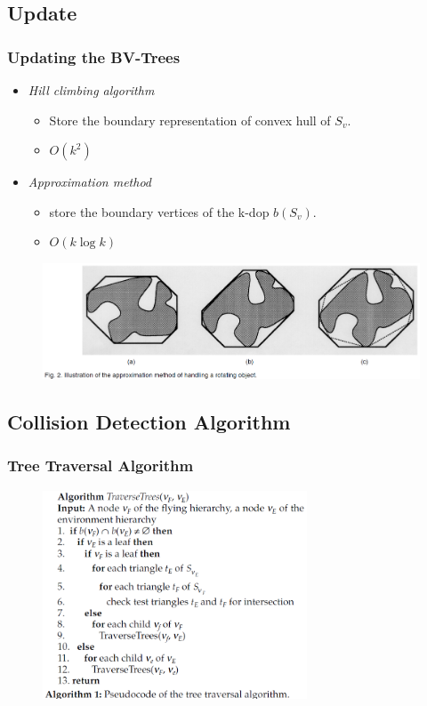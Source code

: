 \documentclass{beamer}
\begin{document}
\subsection{Update}
	\begin{frame}
	\frametitle{Updating the BV-Trees}
	\begin{itemize}
		\item \it{Hill climbing algorithm}
			\begin{itemize}
				\item Store the boundary representation of convex hull of $S_{v}$.
				\item $O(k^{2})$
			\end{itemize}
		\item \it{Approximation method}
			\begin{itemize}
				\item store the boundary vertices of the k-dop $b(S_{v})$.
				\item $O(k\log k)$
			\end{itemize}
	\end{itemize}	
	\begin{figure}
		\centering
		\includegraphics[width=1.0\textwidth]{./figure/update.PNG}
	\end{figure}
	\end{frame}

\subsection{Collision Detection Algorithm}
	\begin{frame}
	\frametitle{Tree Traversal Algorithm}
	\begin{figure}[h!]
		\centering
		\includegraphics[width=0.7\textwidth]{./figure/algorithm.PNG}
	\end{figure}
	\end{frame}
\end{document}
